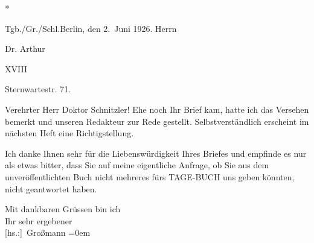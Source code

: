 \pstart
           \centering{}\textcolor{gray}{\textbf{*}}\pend
           
\pstart
           Tgb./Gr./Schl.\hfill Berlin, den 2. Juni 1926.\pend
           {\vspace{1\baselineskip}}
\pstart
           \raggedleft{}Herrn\pend
           
\pstart
           \raggedleft{}Dr. Arthur \pend
           
\pstart
           \raggedleft{} XVIII\pend
           
\pstart
           \raggedleft{}Sternwartestr. 71.\pend
           
\pstart{}Verehrter Herr Doktor Schnitzler!\pend\vspace{0.5em}
\pstart
           Ehe noch Ihr Brief kam, hatte ich das Versehen bemerkt und unseren Redakteur zur Rede gestellt.
               Selbstverständlich erscheint im nächsten Heft eine Richtigstellung.\pend
           
\pstart
           Ich danke Ihnen sehr für die Liebenswürdigkeit Ihres Briefes und empfinde es nur als
               etwas bitter, dass Sie auf meine eigentliche Anfrage, ob Sie aus dem
               unveröffentlichten Buch nicht
               mehreres fürs TAGE-BUCH uns geben könnten, nicht geantwortet haben.\pend
           
\pstart
           Mit dankbaren Grüssen bin ich{\\[\baselineskip]}Ihr sehr ergebener{\\[\baselineskip]}\spacefill\mbox{{[}hs.:{]} Großmann}\pend
           \leftskip=0em{}\endnumbering{}  \newcommand{\dateiname}{L02477}\newcommand{\titel}{Stefan Großmann an Arthur Schnitzler, 2. 6. 1926}\newcommand{\editorInnen}{Herausgegeben von Martin Anton Müller}
